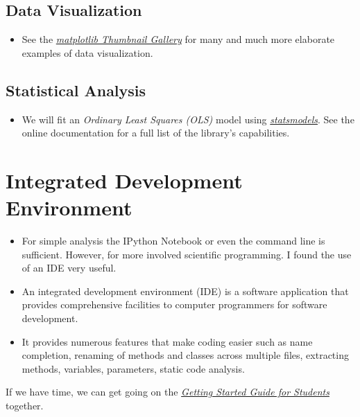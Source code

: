 \subsection{Data Visualization }
\begin{itemize}
\item See the \href{http://matplotlib.org/gallery.html}{\textit{matplotlib Thumbnail Gallery}} for many and much more elaborate examples of data visualization.
\end{itemize}
\subsection{Statistical Analysis}
\begin{itemize}
\item We will fit an \textit{Ordinary Least Squares (OLS)} model using \href{http://statsmodels.sourceforge.net}{\textit{statsmodels}}. See the online documentation for a full list of the library's capabilities.
\end{itemize}
\section{Integrated Development Environment}
\begin{itemize}
\item For simple analysis the IPython Notebook or even the command line is sufficient. However, for more involved scientific programming. I found the use of an IDE very useful.
\item An integrated development environment (IDE) is a software application that provides comprehensive facilities to computer programmers for software development.
\item It provides numerous features that make coding easier such as name completion, renaming of methods and classes across multiple files, extracting methods, variables, parameters, static code analysis.
\end{itemize}

If we have time, we can get going on the \href{http://bit.ly/1WDDJny}{\textit{Getting Started Guide for Students}} together. 
